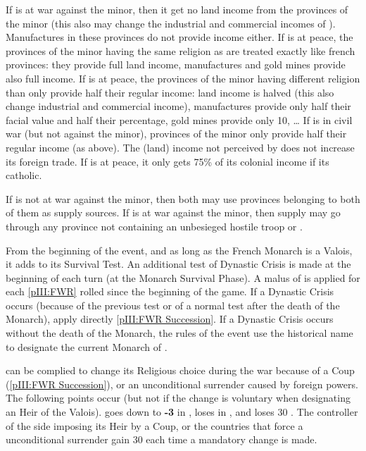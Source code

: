 \aparag[Incomes]
\bparag If \FRA is at war against the minor, then it get no land income from
the provinces of the minor (this also may change the industrial and commercial
incomes of \FRA). Manufactures in these provinces do not provide income
either.
\bparag If \FRA is at peace, the provinces of the minor having the same
religion as \FRA are treated exactly like french provinces: they provide full
land income, manufactures and gold mines provide also full income.
\bparag If \FRA is at peace, the provinces of the minor having different
religion than \FRA only provide half their regular income: land income is
halved (this also change industrial and commercial income), manufactures
provide only half their facial value and half their percentage, gold mines
provide only 10\ducats, \ldots
\bparag If \FRA is in civil war (but not against the minor), provinces of the
minor only provide half their regular income (as above).
\bparag The (land) income not perceived by \FRA does not increase its foreign
trade.
\bparag If \FRA is at peace, it only gets 75\% of its colonial income if its
catholic.

\bparag If \FRA is not at war against the minor, then both may use provinces
belonging to both of them as supply sources.
\bparag If \FRA is at war against the minor, then supply may go through any
province not containing an unbesieged hostile troop or \REVOLT .

\effetlong
{}
\bparag From the beginning of the event, and as long as the French Monarch is
a Valois, it adds  to its Survival Test.
\bparag An additional test of Dynastic Crisis is made at the beginning of each
turn (at the Monarch Survival Phase). A malus of  is applied for
each \ref{pIII:FWR} rolled since the beginning of the game.
\bparag If a Dynastic Crisis occurs (because of the previous test or of a
normal test after the death of the Monarch), apply directly \ref{pIII:FWR
  Succession}.  If a Dynastic Crisis occurs without the death of the Monarch,
the rules of the event use the historical name  to
designate the current Monarch of \FRA.

 \FRA can be complied to change
its Religious choice during the war because of a Coup (\ref{pIII:FWR
  Succession}), or an unconditional surrender caused by foreign powers. The
following points occur (but not if the change is voluntary when designating an
Heir of the Valois).
\bparag \FRA goes down to {\bf -3} in \STAB, loses  in \FTI, and
loses 30 \PV.
\bparag The controller of the side imposing its Heir by a Coup, or the
countries that force a unconditional surrender gain 30 \PV each time a
mandatory change is made.

